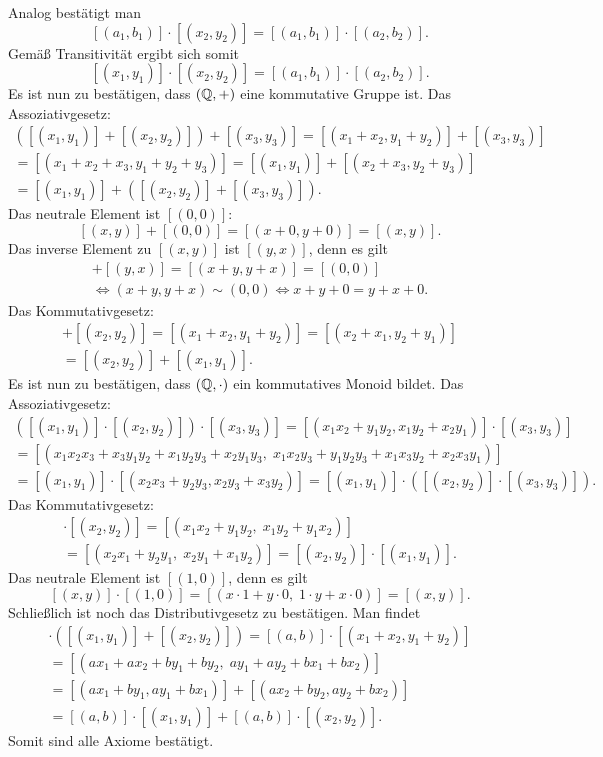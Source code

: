 Analog bestätigt man
\[[(a_1,b_1)]\cdot [(x_2,y_2)] = [(a_1,b_1)]\cdot [(a_2,b_2)].\]
Gemäß Transitivität ergibt sich somit
\[[(x_1,y_1)]\cdot [(x_2,y_2)] = [(a_1,b_1)]\cdot [(a_2,b_2)].\]
Es ist nun zu bestätigen, dass $(\mathbb Q,+)$ eine kommutative Gruppe ist.
Das Assoziativgesetz:
\begin{gather*}
([(x_1,y_1)]+[(x_2,y_2)])+[(x_3,y_3)]
= [(x_1+x_2,y_1+y_2)] + [(x_3,y_3)]\\
= [(x_1+x_2+x_3,y_1+y_2+y_3)]
= [(x_1,y_1)]+[(x_2+x_3,y_2+y_3)]\\
= [(x_1,y_1)]+([(x_2,y_2)]+[(x_3,y_3)]).
\end{gather*}
Das neutrale Element ist $[(0,0)]$:
\[[(x,y)]+[(0,0)] = [(x+0,y+0)] = [(x,y)].\]
Das inverse Element zu $[(x,y)]$ ist $[(y,x)]$, denn es gilt
\begin{gather*}
[(x,y)]+[(y,x)] = [(x+y,y+x)] = [(0,0)]\\
\iff (x+y,y+x)\sim (0,0)\iff x+y+0 = y+x+0.
\end{gather*}
Das Kommutativgesetz:
\begin{gather*}
[(x_1,y_1)]+[(x_2,y_2)] = [(x_1+x_2,y_1+y_2)]
= [(x_2+x_1,y_2+y_1)]\\
= [(x_2,y_2)]+[(x_1,y_1)].
\end{gather*}
Es ist nun zu bestätigen, dass $(\mathbb Q,\cdot)$ ein kommutatives
Monoid bildet. Das Assoziativgesetz:
\begin{gather*}
([(x_1,y_1)]\cdot [(x_2,y_2)])\cdot [(x_3,y_3)]
= [(x_1x_2+y_1y_2,x_1y_2+x_2y_1)]\cdot [(x_3,y_3)]\\
= [(x_1x_2x_3+x_3y_1y_2+x_1y_2y_3+x_2y_1y_3,\;
x_1x_2y_3+y_1y_2y_3+x_1x_3y_2+x_2x_3y_1)]\\
= [(x_1,y_1)]\cdot [(x_2x_3+y_2y_3,x_2y_3+x_3y_2)]
= [(x_1,y_1)]\cdot ([(x_2,y_2)]\cdot [(x_3,y_3)]).
\end{gather*}
Das Kommutativgesetz:
\begin{gather*}
[(x_1,y_1)]\cdot [(x_2,y_2)] = [(x_1x_2+y_1y_2,\;x_1y_2+y_1x_2)]\\
= [(x_2x_1+y_2y_1,\;x_2y_1+x_1y_2)] = [(x_2,y_2)]\cdot [(x_1,y_1)].
\end{gather*}
Das neutrale Element ist $[(1,0)]$, denn es gilt
\[[(x,y)]\cdot [(1,0)] = [(x\cdot 1+y\cdot 0,\;1\cdot y+x\cdot 0)]
= [(x,y)].\]
Schließlich ist noch das Distributivgesetz zu bestätigen.
Man findet
\begin{gather*}
[(a,b)]\cdot ([(x_1,y_1)]+[(x_2,y_2)])
= [(a,b)]\cdot [(x_1+x_2,y_1+y_2)]\\
= [(ax_1+ax_2+by_1+by_2,\;ay_1+ay_2+bx_1+bx_2)]\\
= [(ax_1+by_1,ay_1+bx_1)]+[(ax_2+by_2,ay_2+bx_2)]\\
= [(a,b)]\cdot [(x_1,y_1)] + [(a,b)]\cdot [(x_2,y_2)].
\end{gather*}
Somit sind alle Axiome bestätigt.\;\qedsymbol

